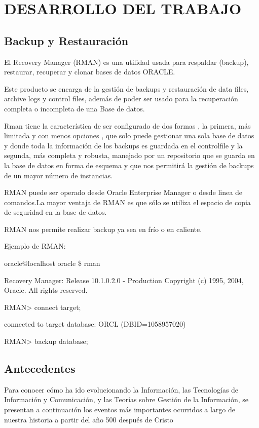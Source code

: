 \chapter{DESARROLLO DEL TRABAJO}

\section{Backup y Restauración}
El Recovery Manager (RMAN) es una utilidad usada para respaldar (backup), restaurar, recuperar y clonar bases de datos ORACLE.

Este producto se encarga de la gestión de backups y restauración de data files, archive logs y control files, además de poder ser usado para la recuperación completa o incompleta de una Base de datos.

Rman tiene la característica de ser configurado de dos formas , la primera, más limitada y con menos opciones , que solo puede gestionar una sola base de datos y donde toda la información de los backups es guardada en el controlfile y la segunda, más completa y robusta, manejado por un repositorio que se guarda en la base de datos en forma de esquema y que nos permitirá la gestión de backups de un mayor número de instancias.

RMAN puede ser operado desde Oracle Enterprise Manager o desde linea de comandos.La mayor ventaja de RMAN es que sólo se utiliza el espacio de copia de seguridad en la base de datos.

RMAN nos permite realizar backup ya sea en frío o en caliente.

Ejemplo de RMAN:

\begin{list}{}{}
\item [oracle@localhost oracle] \$ rman
\item Recovery Manager: Release 10.1.0.2.0 - Production Copyright (c) 1995, 2004, Oracle. All rights reserved.
\item RMAN> connect target;
\item connected to target database: ORCL (DBID=1058957020)
\item RMAN> backup database;
\end{list}


\section{Antecedentes}
Para conocer cómo ha ido evolucionando la Información, las Tecnologías de Información y Comunicación, y las Teorías sobre Gestión de la Información, se presentan a continuación los eventos m\'as importantes ocurridos a largo de nuestra historia a partir del año 500 después de Cristo

